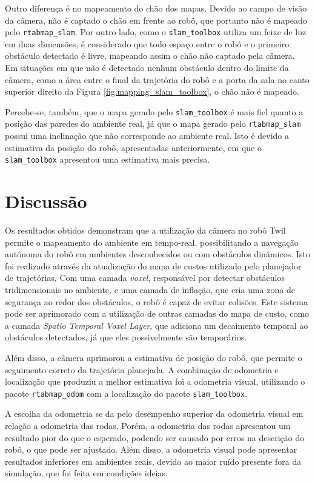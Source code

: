 \documentclass[repeatfields,xlists,xpacks,oneside,yearsonly]{ufrgscca}
\begin{document}
Outro diferença é no mapeamento do chão dos mapas. Devido ao campo de
visão da câmera, não é captado o chão em frente ao robô, que portanto
não é mapeado pelo \texttt{rtabmap\_slam}. Por outro lado, como o
\texttt{slam\_toolbox} utiliza um feixe de luz em duas dimensões, é
considerado que todo espaço entre o robô e o primeiro obstáculo
detectado é livre, mapeando assim o chão não captado pela câmera. Em
situações em que não é detectado nenhum obstáculo dentro do limite da
câmera, como a área entre o final da trajetória do robô e a porta da
sala no canto superior direito da Figura
\ref{fig:mapping_slam_toolbox}, o chão não é mapeado.

Percebe-se, também, que o mapa gerado pelo \texttt{slam\_toolbox} é
mais fiel quanto a posição das paredes do ambiente real, já que o
mapa gerado pelo \texttt{rtabmap\_slam} possui uma inclinação que não
corresponde ao ambiente real. Isto é devido a estimativa da posição
do robô, apresentadas anteriormente, em que o \texttt{slam\_toolbox}
apresentou uma estimativa mais precisa.

\chapter{Discussão}
\label{discussao}

Os resultados obtidos demonstram que a utilização da câmera no robô
Twil permite o mapeamento do ambiente em tempo-real, possibilitando a
navegação autônoma do robô em ambientes desconhecidos ou com
obstáculos dinâmicos. Isto foi realizado através da atualização do
mapa de custos utilizado pelo planejador de trajetórias. Com uma
camada \textit{voxel}, responsável por detectar obstáculos
tridimensionais no ambiente, e uma camada de inflação, que cria uma
zona de segurança ao redor dos obstáculos, o robô é capaz de evitar
colisões. Este sistema pode ser aprimorado com a utilização de outras
camadas do mapa de custo, como a camada \textit{Spatio Temporal Voxel
    Layer}, que adiciona um decaimento temporal ao obstáculos detectados,
já que eles possivelmente são temporários.

Além disso, a câmera aprimorou a estimativa de posição do robô, que
permite o seguimento correto da trajetória planejada. A combinação de
odometria e localização que produziu a melhor estimativa foi a
odometria visual, utilizando o pacote \texttt{rtabmap\_odom} com a
localização do pacote \texttt{slam\_toolbox}.

A escolha da odometria se da pelo desempenho superior da odometria
visual em relação a odometria das rodas. Porém, a odometria das rodas
apresentou um resultado pior do que o esperado, podendo ser causado
por erros na descrição do robô, o que pode ser ajustado. Além disso,
a odometria visual pode apresentar resultados inferiores em ambientes
reais, devido ao maior ruído presente fora da simulação, que foi
feita em condições ideias.
\end{document}

